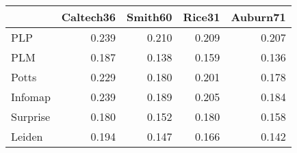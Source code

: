 \begin{tabular}{lrrrr}
\toprule
{} & Caltech36 & Smith60 & Rice31 & Auburn71 \\
\midrule
PLP      &     0.239 &   0.210 &  0.209 &    0.207 \\
PLM      &     0.187 &   0.138 &  0.159 &    0.136 \\
Potts    &     0.229 &   0.180 &  0.201 &    0.178 \\
Infomap  &     0.239 &   0.189 &  0.205 &    0.184 \\
Surprise &     0.180 &   0.152 &  0.180 &    0.158 \\
Leiden   &     0.194 &   0.147 &  0.166 &    0.142 \\
\bottomrule
\end{tabular}
